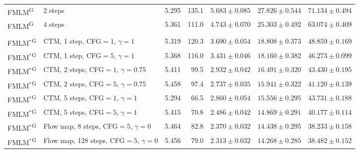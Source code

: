 \begin{table}[h]
{\begin{tabular}{@{}llrrrrr@{}}
      FMLM\textsuperscript{G}
      & 2 steps & 5.295 & 135.1
      & $5.683 \pm 0.085$
      & $27.826 \pm 0.544$
      & $71.134 \pm 0.494$ \\

      FMLM\textsuperscript{G}
      & 4 steps & 5.361 & 111.0
      & $4.743 \pm 0.070$
      & $25.303 \pm 0.492$
      & $63.074 \pm 0.409$ \\

      \addlinespace[2pt]
      \multicolumn{7}{l}{\textit{FMLM*} \cite{yoo2026selfconditionedflowmaplanguage}} \\

     FMLM$^{*}$\textsuperscript{G}
      & CTM, 1 step, CFG$=1$, $\gamma=1$ & 5.319 & 120.3
      & $3.690 \pm 0.054$
      & $18.808 \pm 0.373$
      & $48.859 \pm 0.169$ \\

      FMLM$^{*}$\textsuperscript{G}
      & CTM, 1 step, CFG$=5$, $\gamma=1$ & 5.368 & 116.0
      & $3.431 \pm 0.046$
      & $18.160 \pm 0.382$
      & $46.273 \pm 0.099$ \\

      FMLM$^{*}$\textsuperscript{G}
      & CTM, 2 steps, CFG$=1$, $\gamma=0.75$ & 5.411 & 99.5
      & $2.932 \pm 0.042$
      & $16.491 \pm 0.320$
      & $43.430 \pm 0.195$ \\

      FMLM$^{*}$\textsuperscript{G}
      & CTM, 2 steps, CFG$=5$, $\gamma=0.75$ & 5.458 & 97.4
      & $2.737 \pm 0.035$
      & $15.941 \pm 0.322$
      & $41.120 \pm 0.139$ \\

      FMLM$^{*}$\textsuperscript{G}
      & CTM, 5 steps, CFG$=1$, $\gamma=1$ & 5.294 & 66.5
      & $2.860 \pm 0.054$
      & $15.556 \pm 0.295$
      & $43.731 \pm 0.188$ \\

      FMLM$^{*}$\textsuperscript{G}
      & CTM, 5 steps, CFG$=5$, $\gamma=1$ & 5.415 & 70.8
      & $2.486 \pm 0.042$
      & $14.869 \pm 0.291$
      & $40.177 \pm 0.114$ \\

      \addlinespace[2pt]
      FMLM$^{*}$\textsuperscript{G}
      & Flow map, 8 steps, CFG$=5$, $\gamma=0$ & 5.464 & 82.8
      & $2.370 \pm 0.032$
      & $14.438 \pm 0.295$
      & $38.233 \pm 0.158$ \\

      FMLM$^{*}$\textsuperscript{G}
      & Flow map, 128 steps, CFG$=5$, $\gamma=0$ & 5.456 & 79.0
      & $2.313 \pm 0.032$
      & $14.268 \pm 0.285$
      & $38.482 \pm 0.152$ \\


\end{tabular}}
\end{table}
